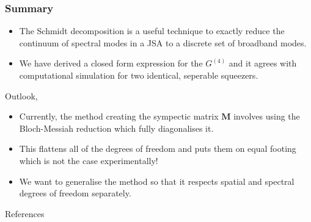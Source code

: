 \documentclass{beamer}
\begin{document}
\begin{frame}
\frametitle{Summary}
\begin{itemize}
    \item The Schmidt decomposition is a useful technique to exactly reduce the continuum of spectral modes in a JSA to a discrete set of broadband modes.
    \item We have derived a closed form expression for the $G^{(4)}$ and it agrees with computational simulation for two identical, seperable squeezers.
    \end{itemize}
Outlook,
\begin{itemize}
    \item Currently, the method creating the sympectic matrix $\textbf{M}$ involves using the Bloch-Messiah reduction which fully diagonalises it. 
    \item This flattens all of the degrees of freedom and puts them on equal footing which is not the case experimentally!
    \item We want to generalise the method so that it respects spatial and spectral degrees of freedom separately.
\end{itemize}
\end{frame}

\begin{frame}{References}


\end{frame}
\end{document}
